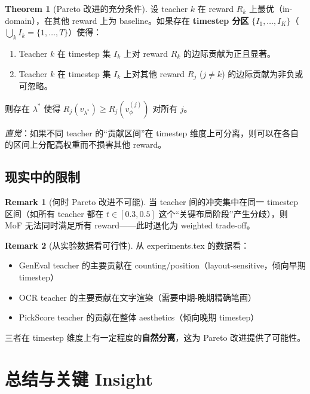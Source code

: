 \documentclass[11pt,a4paper]{article}
\newcommand{\vphi}{v_\phi}
\theoremstyle{definition}
\newtheorem{remark}{Remark}
\newtheorem{theorem}{Theorem}
\begin{document}
\begin{theorem}[Pareto 改进的充分条件]
\label{thm:pareto}
设 teacher $k$ 在 reward $R_k$ 上最优（in-domain），在其他 reward 上为 baseline。如果存在 \textbf{timestep 分区} $\{I_1, \ldots, I_K\}$（$\bigcup_k I_k = \{1, \ldots, T\}$）使得：
\begin{enumerate}[leftmargin=1.5em]
\item Teacher $k$ 在 timestep 集 $I_k$ 上对 reward $R_k$ 的边际贡献为正且显著。
\item Teacher $k$ 在 timestep 集 $I_k$ 上对其他 reward $R_j$ ($j \neq k$) 的边际贡献为非负或可忽略。
\end{enumerate}
则存在 $\lambda^*$ 使得 $R_j(v_{\lambda^*}) \geq R_j(\vphi^{(j)})$ 对所有 $j$。

\textit{直觉}：如果不同 teacher 的``贡献区间''在 timestep 维度上可分离，则可以在各自的区间上分配高权重而不损害其他 reward。
\end{theorem}

\subsection{现实中的限制}

\begin{remark}[何时 Pareto 改进不可能]
当 teacher 间的冲突集中在同一 timestep 区间（如所有 teacher 都在 $t \in [0.3, 0.5]$ 这个``关键布局阶段''产生分歧），则 MoF 无法同时满足所有 reward——此时退化为 weighted trade-off。
\end{remark}

\begin{remark}[从实验数据看可行性]
从 experiments.tex 的数据看：
\begin{itemize}
\item GenEval teacher 的主要贡献在 counting/position（layout-sensitive，倾向早期 timestep）
\item OCR teacher 的主要贡献在文字渲染（需要中期-晚期精确笔画）
\item PickScore teacher 的贡献在整体 aesthetics（倾向晚期 timestep）
\end{itemize}
三者在 timestep 维度上有一定程度的\textbf{自然分离}，这为 Pareto 改进提供了可能性。
\end{remark}

\section{总结与关键 Insight}
\label{sec:summary}
\end{document}
